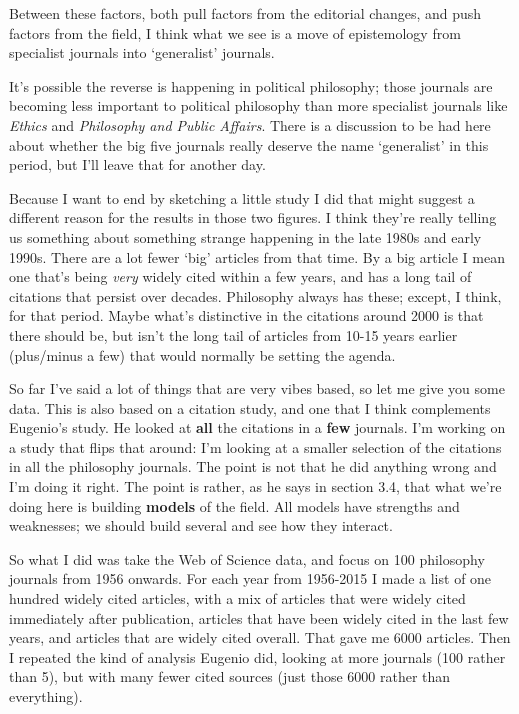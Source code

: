 \documentclass[
  10pt,
  letterpaper,
  DIV=11,
  numbers=noendperiod,
  twoside]{scrartcl}
\begin{document}
Between these factors, both pull factors from the editorial changes, and
push factors from the field, I think what we see is a move of
epistemology from specialist journals into `generalist' journals.

It's possible the reverse is happening in political philosophy; those
journals are becoming less important to political philosophy than more
specialist journals like \emph{Ethics} and \emph{Philosophy and Public
Affairs}. There is a discussion to be had here about whether the big
five journals really deserve the name `generalist' in this period, but
I'll leave that for another day.

Because I want to end by sketching a little study I did that might
suggest a different reason for the results in those two figures. I think
they're really telling us something about something strange happening in
the late 1980s and early 1990s. There are a lot fewer `big' articles
from that time. By a big article I mean one that's being \emph{very}
widely cited within a few years, and has a long tail of citations that
persist over decades. Philosophy always has these; except, I think, for
that period. Maybe what's distinctive in the citations around 2000 is
that there should be, but isn't the long tail of articles from 10-15
years earlier (plus/minus a few) that would normally be setting the
agenda.

So far I've said a lot of things that are very vibes based, so let me
give you some data. This is also based on a citation study, and one that
I think complements Eugenio's study. He looked at \textbf{all} the
citations in a \textbf{few} journals. I'm working on a study that flips
that around: I'm looking at a smaller selection of the citations in all
the philosophy journals. The point is not that he did anything wrong and
I'm doing it right. The point is rather, as he says in section 3.4, that
what we're doing here is building \textbf{models} of the field. All
models have strengths and weaknesses; we should build several and see
how they interact.

So what I did was take the Web of Science data, and focus on 100
philosophy journals from 1956 onwards. For each year from 1956-2015 I
made a list of one hundred widely cited articles, with a mix of articles
that were widely cited immediately after publication, articles that have
been widely cited in the last few years, and articles that are widely
cited overall. That gave me 6000 articles. Then I repeated the kind of
analysis Eugenio did, looking at more journals (100 rather than 5), but
with many fewer cited sources (just those 6000 rather than everything).
\end{document}
